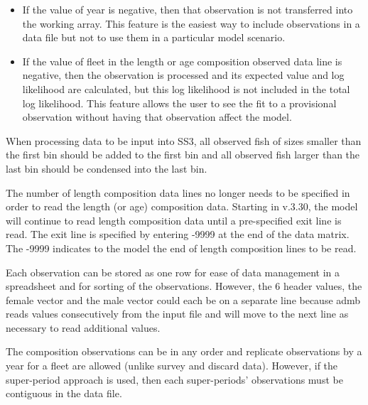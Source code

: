 	\begin{itemize}
		\item If the value of year is negative, then that observation is not transferred into the working array. This feature is the easiest way to include observations in a data file but not to use them in a particular model scenario.
		\item If the value of fleet in the length or age composition observed data line is negative, then the observation is processed and its expected value and log likelihood are calculated, but this log likelihood is not included in the total log likelihood. This feature allows the user to see the fit to a provisional observation without having that observation affect the model.
	\end{itemize}

When processing data to be input into SS3, all observed fish of sizes smaller than the first bin should be added to the first bin and all observed fish larger than the last bin should be condensed into the last bin.	

The number of length composition data lines no longer needs to be specified in order to read the length (or age) composition data. Starting in v.3.30, the model will continue to read length composition data until a pre-specified exit line is read. The exit line is specified by entering -9999 at the end of the data matrix. The -9999 indicates to the model the end of length composition lines to be read.

Each observation can be stored as one row for ease of data management in a spreadsheet and for sorting of the observations. However, the 6 header values, the female vector and the male vector could each be on a separate line because \gls{admb} reads values consecutively from the input file and will move to the next line as necessary to read additional values.

The composition observations can be in any order and replicate observations by a year for a fleet are allowed (unlike survey and discard data). However, if the super-period approach is used, then each super-periods' observations must be contiguous in the data file.

\hypertarget{AgeCompOption}{}
